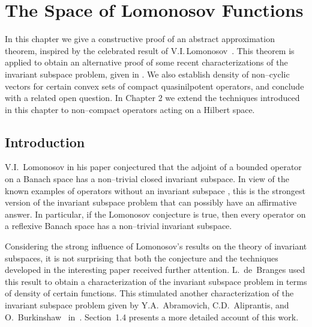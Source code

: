 \def\baselinestretch{1}

\chapter{The Space of Lomonosov Functions}

\def\baselinestretch{1.66}



In this chapter we give a constructive proof of an abstract approximation
theorem, inspired by the celebrated result of V.I.\,Lomonosov~\cite{Lom73}.
This theorem is applied to obtain an alternative proof of some recent
characterizations of the invariant subspace problem, given in \cite{AAB95}.
We also establish density of non--cyclic vectors for certain convex sets of
compact quasinilpotent operators, and conclude with a related open question.
In Chapter 2 we extend the techniques introduced in this chapter to
non--compact operators acting on a Hilbert space.

\smallskip

\goodbreak
\section{Introduction}

V.I.~Lomonosov in his paper \cite{Lom91} conjectured that the adjoint of a
bounded operator on a Banach space has a non--trivial closed invariant
subspace. In view of the known examples of operators without an invariant
subspace \cite{Enf87,Rea85}, this is the strongest version of the invariant
subspace problem that can possibly have an affirmative answer. In particular,
if the Lomonosov conjecture is true, then every operator on a reflexive
Banach space has a non--trivial invariant subspace.

\bigskip
\goodbreak

Considering the strong influence of Lomonosov's results on the theory of
invariant subspaces, it is not surprising that both the conjecture and the
techniques developed in the interesting paper \cite{Lom91} received further
attention. L.~de~Branges used this result to obtain a characterization of the
invariant subspace problem in terms of density of certain functions. This
stimulated another characterization of the invariant subspace problem given
by Y.A.~Abramovich, C.D.~Aliprantis, and O.~Burkinshaw ~in~\cite{AAB95}.
Section~1.4 presents a more detailed account of this work.

